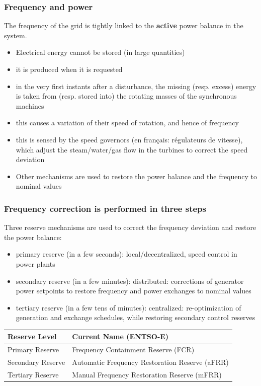 \begin{frame}
  \frametitle{Frequency and power}
  
    The frequency of the grid is tightly linked to the \textbf{active} power balance in the system.
  
    \begin{itemize}
        \item Electrical energy cannot be stored (in large quantities)
        \item it is produced when it is requested 
        \item in the very first instants after a disturbance, the missing (resp. excess) energy is taken from (resp. stored into) the rotating masses of the synchronous machines 
        \item this causes a variation of their speed of rotation, and hence of frequency 
        \item this is sensed by the speed governors (en français: régulateurs de vitesse), which adjust the steam/water/gas flow in the turbines to correct the speed deviation
        \item Other mechanisms are used to restore the power balance and the frequency to nominal values
    \end{itemize}
    

\end{frame}

\begin{frame}
  \frametitle{Frequency correction is performed in three steps}

  Three reserve mechanisms are used to correct the frequency deviation and restore the power balance:

  \begin{itemize}
      \item primary reserve (in a few seconds): local/decentralized, speed control in power plants 
      \item secondary reserve (in a few minutes): distributed: corrections of generator power setpoints to restore frequency and power exchanges to nominal values
      \item tertiary reserve (in a few tens of minutes): centralized: re-optimization of generation and exchange schedules, while restoring secondary control reserves
  \end{itemize}

  \begin{center}

    \begin{tabular}{|l|l|}
      \hline
      \textbf{Reserve Level} & \textbf{Current Name (ENTSO-E)} \\
      \hline
      Primary Reserve   & Frequency Containment Reserve (FCR) \\
      Secondary Reserve & Automatic Frequency Restoration Reserve (aFRR) \\
      Tertiary Reserve  & Manual Frequency Restoration Reserve (mFRR) \\
      \hline
    \end{tabular}
  \end{center}

\end{frame}
      
